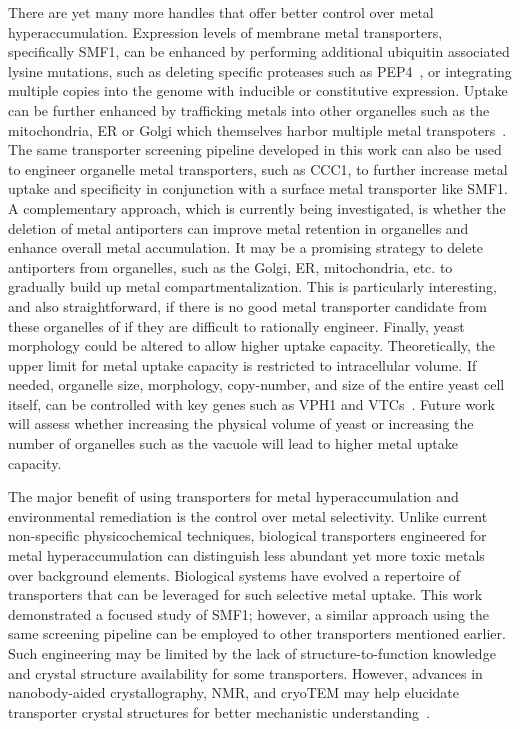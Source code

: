 \documentclass[../main/main]{subfiles}
\begin{document}
There are yet many more handles that offer better control over metal hyperaccumulation. Expression levels of membrane metal transporters, specifically SMF1, can be enhanced by performing additional ubiquitin associated lysine mutations, such as deleting specific proteases such as PEP4~\cite{nikko2008,liu1999},
or integrating multiple copies into the genome with inducible or constitutive expression. Uptake can be further enhanced by trafficking metals into other organelles such as the mitochondria, ER or Golgi which themselves harbor multiple metal transpoters~\cite{luk2003}.
The same transporter screening pipeline developed in this work can also be used to engineer organelle metal transporters, such as CCC1, to further increase metal uptake and specificity in conjunction with a surface metal transporter like SMF1. A complementary approach, which is currently being investigated, is whether the deletion of metal antiporters can improve metal retention in organelles and enhance overall metal accumulation. It may be a promising strategy to delete antiporters from organelles, such as the Golgi, ER, mitochondria, etc. to gradually build up metal compartmentalization. This is particularly interesting, and also straightforward, if there is no good metal transporter candidate from these organelles of if they are difficult to rationally engineer. Finally, yeast morphology could be altered to allow higher uptake capacity. Theoretically, the upper limit for metal uptake capacity is restricted to intracellular volume. If needed, organelle size, morphology, copy-number, and size of the entire yeast cell itself, can be controlled with key genes such as VPH1 and VTCs~\cite{desfougeres2016,turner2012}.
Future work will assess whether increasing the physical volume of yeast or increasing the number of organelles such as the vacuole will lead to higher metal uptake capacity.

The major benefit of using transporters for metal hyperaccumulation and environmental remediation is the control over metal selectivity. Unlike current non-specific physicochemical techniques, biological transporters engineered for metal hyperaccumulation can distinguish less abundant yet more toxic metals over background elements. Biological systems have evolved a repertoire of transporters that can be leveraged for such selective metal uptake. This work demonstrated a focused study of SMF1; however, a similar approach using the same screening pipeline can be employed to other transporters mentioned earlier. Such engineering may be limited by the lack of structure-to-function knowledge and crystal structure availability for some transporters. However, advances in nanobody-aided crystallography, NMR, and cryoTEM may help elucidate transporter crystal structures for better mechanistic understanding~\cite{bozzi2016a,ehrnstorfer2014}.
\end{document}
